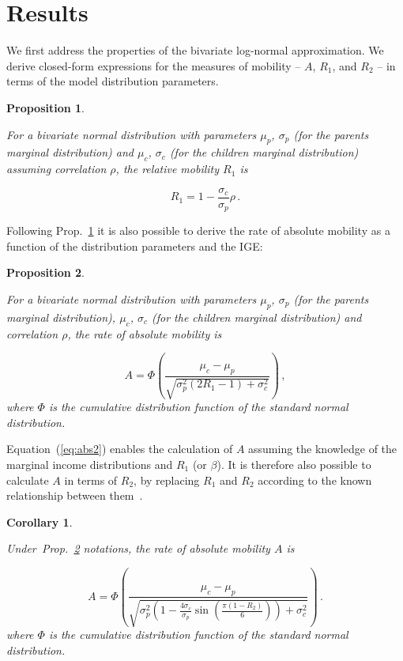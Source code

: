 \documentclass[12pt,a4paper]{article}
\newtheorem{corollary}[theorem]{Corollary}
\newtheorem{proposition}{Proposition}
\newcommand{\elabel}[1]{\label{eq:#1}}
\newcommand{\Eref}[1]{Equation~(\ref{eq:#1})}
\newcommand{\pref}[1]{Prop.~\ref{prop:#1}}
\newcommand{\clabel}[1]{\label{coro:#1}}
\newcommand{\be}{\begin{equation}}
\newcommand{\ee}{\end{equation}}
\numberwithin{equation}{section}
\begin{document}
\section{Results}
\label{sec:results}

We first address the properties of the bivariate log-normal approximation. We derive closed-form expressions for the measures of mobility -- $A$, $R_1$, and $R_2$ -- in terms of the model distribution parameters.

\begin{proposition}
\label{prop:prop1}

For a bivariate normal distribution with parameters $\mu_p$, $\sigma_p$ (for the parents marginal distribution) and $\mu_c$, $\sigma_c$ (for the children marginal distribution) assuming correlation $\rho$, the relative mobility $R_1$ is

\be
R_1 = 1-\frac{\sigma_c}{\sigma_p}\rho \,.
\elabel{beta_rho}
\ee
\end{proposition}

Following \pref{prop1} it is also possible to derive the rate of absolute mobility as a function of the distribution parameters and the IGE:

\begin{proposition}
\label{prop:prop2}

For a bivariate normal distribution with parameters $\mu_p$, $\sigma_p$ (for the parents marginal distribution), $\mu_c$, $\sigma_c$ (for the children marginal distribution) and correlation $\rho$, the rate of absolute mobility is

\be
A = \Phi\left(\frac{\mu_c - \mu_p}{\sqrt{\sigma_p^2\left(2R_1-1\right) + \sigma_c^2}}\right) \,,
\elabel{abs2}
\ee
where $\Phi$ is the cumulative distribution function of the standard normal distribution.
\end{proposition}

\Eref{abs2} enables the calculation of $A$ assuming the knowledge of the marginal income distributions and $R_1$ (or $\beta$). It is therefore also possible to calculate $A$ in terms of $R_2$, by replacing $R_1$ and $R_2$ according to the known relationship between them~\citep{trivedi2007copula}.

\begin{corollary}
\clabel{coro1}

Under~\pref{prop2} notations, the rate of absolute mobility $A$ is

\be
A = \Phi\left(\frac{\mu_c - \mu_p}{\sqrt{\sigma_p^2\left(1 - \frac{4\sigma_c}{\sigma_p}\sin{\left(\frac{\pi\left(1-R_2\right)}{6}\right)}\right) + \sigma_c^2}}\right) \,.
\elabel{abs3}
\ee
where $\Phi$ is the cumulative distribution function of the standard normal distribution.
\end{corollary}
\end{document}

